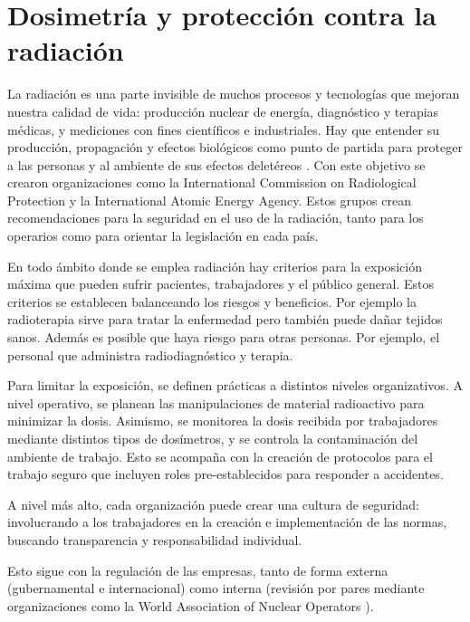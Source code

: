 \section{Dosimetría y protección contra la radiación}
La radiación es una parte invisible de muchos procesos 
y tecnologías que mejoran nuestra calidad de vida:
producción nuclear de energía, 
diagnóstico y terapias médicas, 
y mediciones con fines científicos e industriales.
Hay que entender su producción, propagación y efectos biológicos
como punto de partida para 
proteger a las personas y al ambiente de sus efectos deletéreos
\cite{iaea_radiation_????}.
Con este objetivo se crearon organizaciones como la International Commission on
Radiological Protection\cite{_icrp_????} y la International Atomic Energy
Agency\cite{iaea_official_????}.
Estos grupos crean recomendaciones para la seguridad en el uso de la radiación,
tanto para los operarios como para orientar la legislación en cada país.

En todo ámbito donde se emplea radiación 
hay criterios para la exposición máxima 
que pueden sufrir pacientes,
trabajadores y el público general.
Estos criterios se establecen balanceando los riesgos y beneficios.
Por ejemplo la radioterapia sirve para tratar la enfermedad
pero también puede dañar tejidos sanos.
Además es posible que haya riesgo para otras personas.
Por ejemplo, el personal que administra radiodiagnóstico y terapia.

Para limitar la exposición,
se definen prácticas a distintos niveles organizativos.
A nivel operativo, se planean las manipulaciones de material radioactivo
para minimizar la dosis.
Asimismo, se monitorea la dosis recibida por trabajadores 
mediante distintos tipos de dosímetros,
y se controla la contaminación del ambiente de trabajo.
Esto se acompaña con la creación de protocolos para el trabajo seguro
que incluyen roles pre-establecidos para responder a accidentes.

A nivel más alto, cada organización puede crear una cultura de seguridad:
involucrando a los trabajadores en la creación e implementación de las normas,
buscando transparencia y responsabilidad individual. 

Esto sigue con 
la regulación de las empresas, tanto de forma externa 
(gubernamental e internacional) como interna (revisión por pares mediante
organizaciones como la World Association of Nuclear Operators
\cite{washington_practice_1997}).
